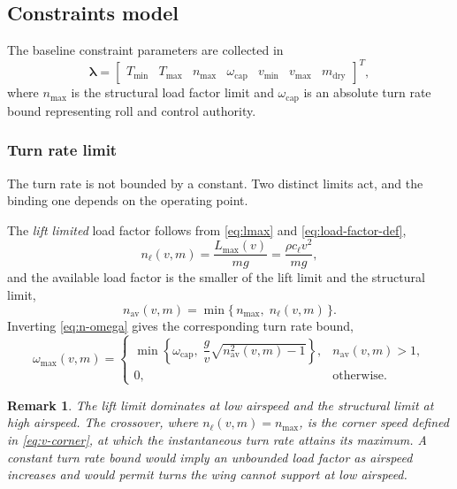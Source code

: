 \documentclass[11pt,a4paper]{article}
\newtheorem{remark}{Remark}
\newcommand{\veclambda}{\bm{\lambda}}
\begin{document}
\subsection{Constraints model}

The baseline constraint parameters are collected in
\begin{equation}
  \veclambda = \begin{bmatrix}
    T_{\min} & T_{\max} & n_{\max} & \omega_{\mathrm{cap}} &
    v_{\min} & v_{\max} & m_{\mathrm{dry}}
  \end{bmatrix}^{T},
  \label{eq:lambda}
\end{equation}
where $n_{\max}$ is the structural load factor limit and $\omega_{\mathrm{cap}}$
is an absolute turn rate bound representing roll and control authority.

\subsubsection{Turn rate limit}

The turn rate is not bounded by a constant. Two distinct limits act, and the
binding one depends on the operating point.

The \emph{lift limited} load factor follows from \cref{eq:lmax} and
\cref{eq:load-factor-def},
\begin{equation}
  n_\ell(v, m) = \frac{L_{\max}(v)}{mg} = \frac{\rho c_\ell v^{2}}{mg},
  \label{eq:n-lift}
\end{equation}
and the available load factor is the smaller of the lift limit and the
structural limit,
\begin{equation}
  n_{\mathrm{av}}(v, m) = \min\{\, n_{\max},\; n_\ell(v, m) \,\}.
  \label{eq:n-available}
\end{equation}
Inverting \cref{eq:n-omega} gives the corresponding turn rate bound,
\begin{equation}
  \omega_{\max}(v, m) =
  \begin{cases}
    \min\left\{ \omega_{\mathrm{cap}},\;
      \dfrac{g}{v}\sqrt{n_{\mathrm{av}}^{2}(v,m) - 1} \right\},
      & n_{\mathrm{av}}(v,m) > 1, \\[10pt]
    0, & \text{otherwise.}
  \end{cases}
  \label{eq:omega-max}
\end{equation}

\begin{remark}
The lift limit dominates at low airspeed and the structural limit at high
airspeed. The crossover, where $n_\ell(v,m) = n_{\max}$, is the corner speed
defined in \cref{eq:v-corner}, at which the instantaneous turn rate attains its
maximum. A constant turn rate bound would imply an unbounded load factor as
airspeed increases and would permit turns the wing cannot support at low
airspeed.
\end{remark}
\end{document}
